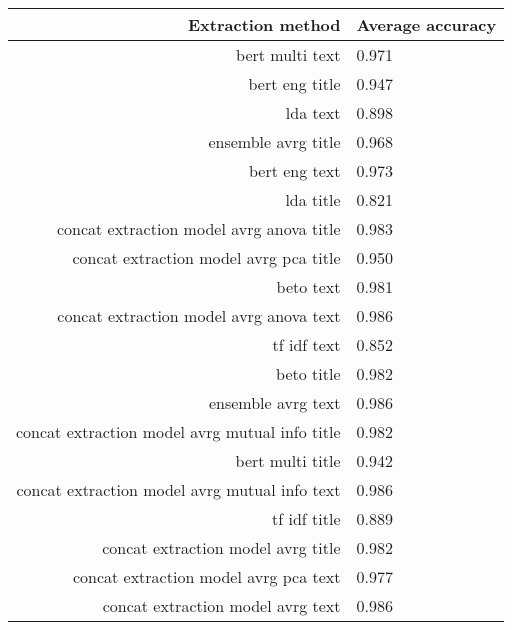 \begin{tabular}{|r|l|}
  \hline
  Extraction method & Average accuracy \\ 
  \hline
  bert multi text & 0.971 \\ 
  \hline
  bert eng title & 0.947 \\ 
  \hline
  lda text & 0.898 \\ 
  \hline
  ensemble avrg title & 0.968 \\ 
  \hline
  bert eng text & 0.973 \\ 
  \hline
  lda title & 0.821 \\ 
  \hline
  concat extraction model avrg anova title & 0.983 \\ 
  \hline
  concat extraction model avrg pca title & 0.950 \\ 
  \hline
  beto text & 0.981 \\ 
  \hline
  concat extraction model avrg anova text & 0.986 \\ 
  \hline
  tf idf text & 0.852 \\ 
  \hline
  beto title & 0.982 \\ 
  \hline
  ensemble avrg text & 0.986 \\ 
  \hline
  concat extraction model avrg mutual info title & 0.982 \\ 
  \hline
  bert multi title & 0.942 \\ 
  \hline
  concat extraction model avrg mutual info text & 0.986 \\ 
  \hline
  tf idf title & 0.889 \\ 
  \hline
  concat extraction model avrg title & 0.982 \\ 
  \hline
  concat extraction model avrg pca text & 0.977 \\ 
  \hline
  concat extraction model avrg text & 0.986 \\ 
  \hline
\end{tabular}
